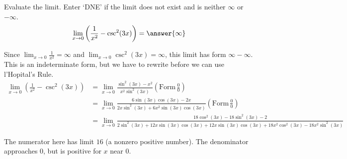 \documentclass{ximera}
\author{Emma Smith Zbarsky \and Bobby Ramsey}
\begin{document}
\begin{exercise}

Evaluate the limit. Enter `DNE' if the limit does not exist and is neither $\infty$ or $-\infty$. 
 \[\lim_{x \to 0} \left(\frac{1}{x^2}- \csc^2(3x)\right) = \answer{\infty}\]




\begin{hint}
Since $\displaystyle \lim_{x\to 0} \frac{1}{x^2}  = \infty$ and $\displaystyle \lim_{x\to 0}  \csc^2(3x) = \infty$, this limit has form $\infty - \infty$. 
This is an indeterminate form, but we have to rewrite before we can use l'Hopital's Rule.
\begin{align*}
\lim_{x\to 0} \left(\frac{1}{x^2}-\csc^2(3x) \right)&= \lim_{x\to 0} \frac{\sin^2(3x)-x^2}{x^2\sin^2(3x)} \left( \text{Form} \,  \frac{0}{0}\right)\\
&=  \lim_{x\to 0} \frac{6\sin(3x)\cos(3x)-2x}{2x\sin^2(3x)+6x^2\sin(3x)\cos(3x)} \left( \text{Form} \, \frac{0}{0}\right) \\
&= \lim_{x\to 0} \frac{18\cos^2(3x)-18\sin^2(3x)-2}{2\sin^2(3x)+12x\sin(3x)\cos(3x)+12x\sin(3x)\cos(3x) + 18x^2\cos^2(3x)-18x^2\sin^2(3x)} 
\end{align*} 

The numerator here has limit $16$ (a nonzero positive number). The denominator approaches $0$, but is positive for $x$ near $0$.

\end{hint}



\end{exercise}
\end{document}
